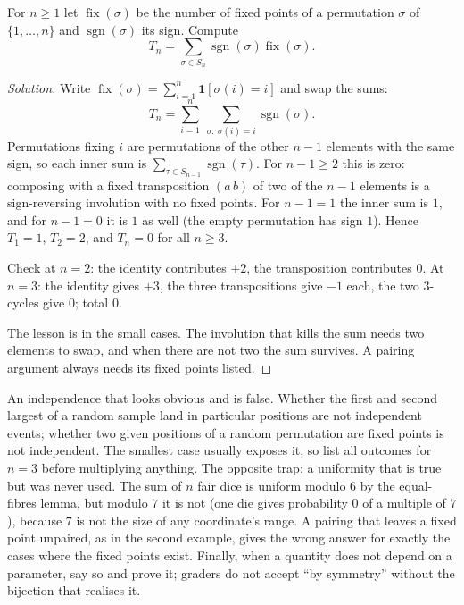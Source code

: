 \begin{example}
For $n\ge 1$ let $\operatorname{fix}(\sigma)$ be the number of fixed points of a permutation $\sigma$ of $\{1,\dots,n\}$ and $\operatorname{sgn}(\sigma)$ its sign. Compute
\[
T_n=\sum_{\sigma\in S_n}\operatorname{sgn}(\sigma)\operatorname{fix}(\sigma).
\]
\end{example}

\begin{proof}[Solution]
Write $\operatorname{fix}(\sigma)=\sum_{i=1}^n \mathbf 1[\sigma(i)=i]$ and swap the sums:
\[
T_n=\sum_{i=1}^n\ \sum_{\sigma:\ \sigma(i)=i}\operatorname{sgn}(\sigma).
\]
Permutations fixing $i$ are permutations of the other $n-1$ elements with the same sign, so each inner sum is $\sum_{\tau\in S_{n-1}}\operatorname{sgn}(\tau)$. For $n-1\ge 2$ this is zero: composing with a fixed transposition $(a\,b)$ of two of the $n-1$ elements is a sign-reversing involution with no fixed points. For $n-1=1$ the inner sum is $1$, and for $n-1=0$ it is $1$ as well (the empty permutation has sign $1$). Hence $T_1=1$, $T_2=2$, and $T_n=0$ for all $n\ge 3$.

Check at $n=2$: the identity contributes $+2$, the transposition contributes $0$. At $n=3$: the identity gives $+3$, the three transpositions give $-1$ each, the two $3$-cycles give $0$; total $0$.

The lesson is in the small cases. The involution that kills the sum needs two elements to swap, and when there are not two the sum survives. A pairing argument always needs its fixed points listed.
\end{proof}

\begin{trap}
An independence that looks obvious and is false. Whether the first and second largest of a random sample land in particular positions are not independent events; whether two given positions of a random permutation are fixed points is not independent. The smallest case usually exposes it, so list all outcomes for $n=3$ before multiplying anything. The opposite trap: a uniformity that is true but was never used. The sum of $n$ fair dice is uniform modulo $6$ by the equal-fibres lemma, but modulo $7$ it is not (one die gives probability $0$ of a multiple of $7$), because $7$ is not the size of any coordinate's range. A pairing that leaves a fixed point unpaired, as in the second example, gives the wrong answer for exactly the cases where the fixed points exist. Finally, when a quantity does not depend on a parameter, say so and prove it; graders do not accept ``by symmetry'' without the bijection that realises it.
\end{trap}

